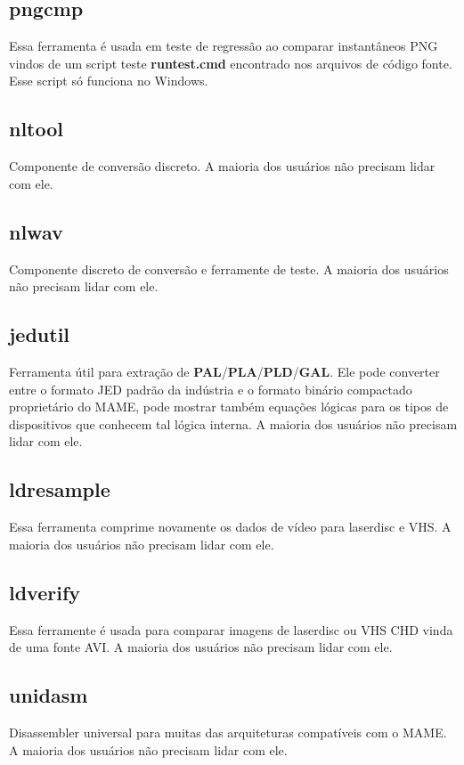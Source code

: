 \documentclass[letterpaper,10pt,brazil]{sphinxmanual}
\begin{document}
\subsection{pngcmp}
\label{tools/othertools:pngcmp}
Essa ferramenta é usada em teste de regressão ao comparar instantâneos
PNG vindos de um script teste \textbf{runtest.cmd} encontrado nos arquivos de
código fonte. Esse script só funciona no Windows.


\subsection{nltool}
\label{tools/othertools:nltool}
Componente de conversão discreto. A maioria dos usuários não precisam
lidar com ele.


\subsection{nlwav}
\label{tools/othertools:nlwav}
Componente discreto de conversão e ferramente de teste. A maioria dos
usuários não precisam lidar com ele.


\subsection{jedutil}
\label{tools/othertools:jedutil}
Ferramenta útil para extração de \textbf{PAL}/\textbf{PLA}/\textbf{PLD}/\textbf{GAL}.
Ele pode converter entre o formato JED padrão da indústria e o formato
binário compactado proprietário do MAME, pode mostrar também equações
lógicas para os tipos de dispositivos que conhecem tal lógica interna.
A maioria dos usuários não precisam lidar com ele.


\subsection{ldresample}
\label{tools/othertools:ldresample}
Essa ferramenta comprime novamente os dados de vídeo para laserdisc e
VHS. A maioria dos usuários não precisam lidar com ele.


\subsection{ldverify}
\label{tools/othertools:ldverify}
Essa ferramente é usada para comparar imagens de laserdisc ou VHS CHD
vinda de uma fonte AVI. A maioria dos usuários não precisam lidar com
ele.


\subsection{unidasm}
\label{tools/othertools:unidasm}
Disassembler universal para muitas das arquiteturas compatíveis com o
MAME. A maioria dos usuários não precisam lidar com ele.
\end{document}
